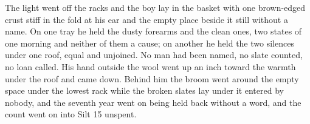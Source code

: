 The light went off the racks and the boy lay in the basket with one brown-edged crust stiff in the fold at his ear and the empty place beside it still without a name. On one tray he held the dusty forearms and the clean ones, two states of one morning and neither of them a cause; on another he held the two silences under one roof, equal and unjoined. No man had been named, no slate counted, no loan called. His hand outside the wool went up an inch toward the warmth under the roof and came down. Behind him the broom went around the empty space under the lowest rack while the broken slates lay under it entered by nobody, and the seventh year went on being held back without a word, and the count went on into Silt 15 unspent.
